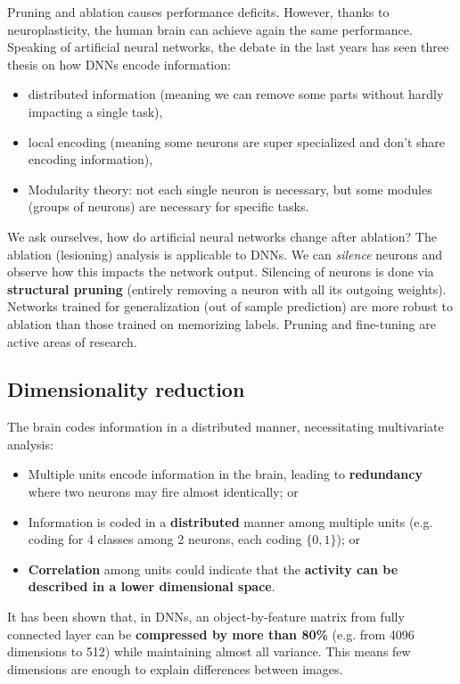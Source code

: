 Pruning and ablation causes performance deficits. However, thanks to neuroplasticity, the human brain can achieve again the same performance.\\

Speaking of artificial neural networks, the debate in the last years has seen three thesis on how DNNs encode information:
\begin{itemize}
    \item distributed information (meaning we can remove some parts without hardly impacting a single task),
    \item local encoding (meaning some neurons are super specialized and don't share encoding information),
    \item Modularity theory: not each single neuron is necessary, but some modules (groups of neurons) are necessary for specific tasks.
\end{itemize}

We ask ourselves, how do artificial neural networks change after ablation?
The ablation (lesioning) analysis is applicable to DNNs. We can \textit{silence} neurons and observe how this impacts the network output. Silencing of neurons is done via \textbf{structural pruning} (entirely removing a neuron with all its outgoing weights).
Networks trained for generalization (out of sample prediction) are more robust to ablation than those trained on memorizing labels. 
Pruning and fine-tuning are active areas of research.

\subsection{Dimensionality reduction}
The brain codes information in a distributed manner, necessitating 
multivariate analysis:
\begin{itemize}
    \item Multiple units encode information in the brain, leading to \textbf{redundancy} where two neurons may fire almost identically; or
    \item Information is coded in a \textbf{distributed} manner among multiple units (e.g. coding for 4 classes among 2 neurons, each coding $\{0,1\}$); or 
    \item \textbf{Correlation} among units could indicate that the \textbf{activity can be described in a lower dimensional space}.
\end{itemize}

It has been shown that, in DNNs, an object-by-feature matrix from fully connected layer can be \textbf{compressed by more than 80\%} (e.g. from 4096 dimensions to 512) while maintaining almost all variance. This means few dimensions are enough to explain differences between images. 

